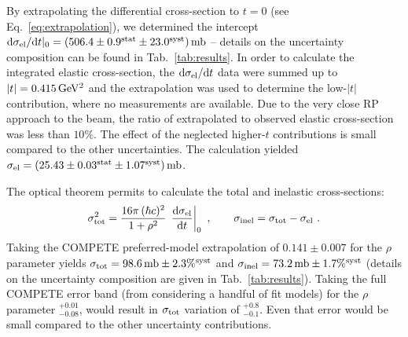 \documentclass[doublecol]{../macros/epl2}
\def\d{{\rm d}}
\def\un#1{\,{\rm #1}}
\begin{document}
By extrapolating the differential cross-section to $t=0$ (see Eq.~\ref{eq:extrapolation}), we determined the intercept
$\d\sigma_{\rm el}/\d t|_0 = (506.4 \pm 0.9^{\rm stat} \pm 23.0^{\rm syst})\un{mb}$
-- details on the uncertainty composition can be found in Tab.~\ref{tab:results}. In order to calculate the integrated elastic cross-section, the $\d\sigma_{\rm el}/\d t$ data were summed up to $|t| = 0.415\un{GeV^2}$ and the extrapolation was used to determine the low-$|t|$ contribution, where no measurements are available. Due to the very close RP approach to the beam, the ratio of extrapolated to observed elastic cross-section was less than $10\%$. The effect of the neglected higher-$t$ contributions is small compared to the other uncertainties. The calculation yielded $\sigma_{\rm el} = (25.43 \pm 0.03^{\rm stat} \pm 1.07^{\rm syst})\un{mb}$.

The optical theorem permits to calculate the total and inelastic cross-sections:
\begin{equation}
\label{eq:si tot}
\sigma_{\rm tot}^2 = {16\pi\, (\hbar c)^2\over 1 + \rho^2}\, \left. \d\sigma_{\rm el}\over\d t\right|_0\ ,\qquad
\sigma_{\rm inel} = \sigma_{\rm tot} - \sigma_{\rm el}\ .
\end{equation}
Taking the COMPETE \cite{compete} preferred-model extrapolation of $0.141\pm 0.007$ for the $\rho$ parameter yields
$\sigma_{\rm tot} = 98.6\un{mb}  \pm 2.3\%^{\rm syst}$ and
$\sigma_{\rm inel} = 73.2\un{mb} \pm 1.7\%^{\rm syst}$ (details on the uncertainty composition are given in Tab.~\ref{tab:results}). Taking the full COMPETE error band (from considering a handful of fit models) for the $\rho$ parameter $^{+0.01}_{-0.08}$, would result in $\sigma_{\rm tot}$ variation of $^{+0.8}_{-0.1}$. Even that error would be small compared to the other uncertainty contributions.

 
\end{document}
